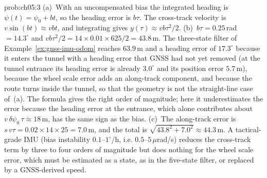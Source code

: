 \begin{sol}{prob:ch05:3}
(a)~With an uncompensated bias the integrated heading is $\psi(t)=\psi_{0}+bt$, so the heading error is $b\tau$. The cross-track velocity is $v\sin(bt)\approx vbt$, and integrating gives $y(\tau)\approx vb\tau^{2}/2$. (b)~$b\tau=0.25$\,rad $=14.3^{\circ}$ and $vb\tau^{2}/2=14\times0.01\times625/2=43.8$\,m. The three-state filter of Example~\ref{ex:gnss-imu-odom} reaches $63.9$\,m and a heading error of $17.3^{\circ}$ because it enters the tunnel with a heading error that GNSS had not yet removed (at the tunnel entrance its heading error is already $3.0^{\circ}$ and its position error $5.7$\,m), because the wheel scale error adds an along-track component, and because the route turns inside the tunnel, so that the geometry is not the straight-line case of~(a). The formula gives the right order of magnitude; here it underestimates the error because the heading error at the entrance, which alone contributes about $v\,\delta\psi_{0}\,\tau\approx18$\,m, has the same sign as the bias. (c)~The along-track error is $s\,v\tau=0.02\times14\times25=7.0$\,m, and the total is $\sqrt{43.8^{2}+7.0^{2}}\approx44.3$\,m. A tactical-grade IMU (bias instability $0.1$--$1^{\circ}$/h, i.e. $0.5$--$5\,\mu$rad/s) reduces the cross-track term by three to four orders of magnitude but does nothing for the wheel scale error, which must be estimated as a state, as in the five-state filter, or replaced by a GNSS-derived speed.
\end{sol}

